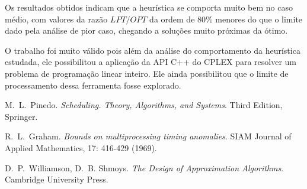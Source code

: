\documentclass[12pt,a4paper]{article}
\begin{document}
Os resultados obtidos indicam que a heurística se comporta muito bem no caso médio, com valores da
razão $LPT/OPT$ da ordem de 80\% menores do que o limite dado pela análise de pior caso, chegando
a soluções muito próximas da ótimo.

O trabalho foi muito válido pois além da análise do comportamento da heurística estudada, ele
possibilitou a aplicação da API C++ do CPLEX para resolver um problema de programação linear 
inteiro. Ele ainda possibilitou que o limite de processamento dessa ferramenta fosse explorado.


\begin{thebibliography}{99}
   M.~L.~Pinedo. {\it Scheduling. Theory, Algorithms, and Systems}. Third Edition,
  Springer.

   R.~L.~Graham. {\it Bounds on multiprocessing timing anomalies}. SIAM Journal of 
  Applied Mathematics, 17: 416-429 (1969).

   D.~P.~Williamson, D.~B. Shmoys. {\it The Design of Approximation Algorithms}. 
  Cambridge University Press.
\end{thebibliography}
\end{document}
